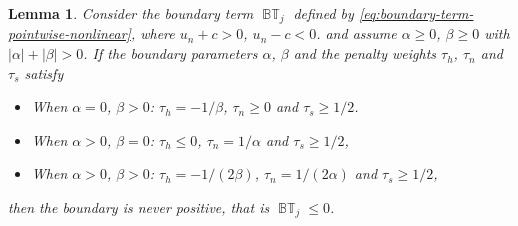 \documentclass[10pt,a4paper]{amsart}
\newtheorem{lemma}{Lemma}
\begin{document}
\begin{lemma}\label{lem:boundary-term-pointwise-nonlinear}
    Consider the boundary term  $\operatorname{\mathbb{BT}}_j$ defined by \eqref{eq:boundary-term-pointwise-nonlinear}, where $u_n + c >0$, $u_n-c < 0$. and assume $\alpha\ge 0$,  $\beta \ge 0$ with $|\alpha| + |\beta| >0$.
    If the boundary parameters $\alpha$, $\beta$ and the penalty weights $\tau_h$, $\tau_n$ and $\tau_s$ satisfy
    \begin{itemize}
      \item[ 1:]  When $\alpha = 0$, $\beta > 0$:  $\tau_h = -1/\beta$, $\tau_n \ge 0$ and $\tau_s \ge 1/2$.
       \item[2:]  When  $\alpha > 0$, $\beta = 0$:  $\tau_h \le 0$, $\tau_n = 1/\alpha$ and $\tau_s \ge 1/2$,
       \item[3:]  When $\alpha > 0$, $\beta > 0$:  $\tau_h =-1/(2\beta)$, $\tau_n = 1/(2\alpha)$ and $\tau_s \ge 1/2$,
    \end{itemize}
  then the boundary is never positive, that is $\operatorname{\mathbb{BT}}_j \le 0$.
\end{lemma}
\end{document}
